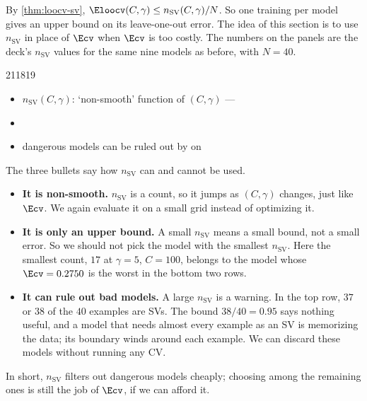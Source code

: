 By \autoref{thm:loocv-sv}, \(\Eloocv(C, \gamma) \le n_{\mathrm{SV}}(C,
\gamma) / N\). So one training per model gives an upper bound on its
leave-one-out error. The idea of this section is to use \(n_{\mathrm{SV}}\)
in place of \(\Ecv\) when \(\Ecv\) is too costly. The numbers on the panels
are the deck's \(n_{\mathrm{SV}}\) values for the same nine models as
before, with \(N = 40\).

\begin{center}
    \begin{minipage}[c]{0.56\textwidth}
        \centering
            {21}{18}{19}
    \end{minipage}%
    \hfill
    \begin{minipage}[c]{0.4\textwidth}
        \begin{itemize}
            \item \(n_{\mathrm{SV}}(C, \gamma)\): `non-smooth' function of
                \((C, \gamma)\) --- 
            \item {}
            \item dangerous models can be ruled out by
                 on 
        \end{itemize}
    \end{minipage}
\end{center}

The three bullets say how \(n_{\mathrm{SV}}\) can and cannot be used.
\begin{itemize}
    \item \textbf{It is non-smooth.} \(n_{\mathrm{SV}}\) is a count, so it
        jumps as \((C, \gamma)\) changes, just like \(\Ecv\). We again
        evaluate it on a small grid instead of optimizing it.
    \item \textbf{It is only an upper bound.} A small \(n_{\mathrm{SV}}\)
        means a small bound, not a small error. So we should not pick the
        model with the smallest \(n_{\mathrm{SV}}\). Here the smallest
        count, \(17\) at \(\gamma = 5\), \(C = 100\), belongs to the model
        whose \(\Ecv = 0.2750\) is the worst in the bottom two rows.
    \item \textbf{It can rule out bad models.} A large \(n_{\mathrm{SV}}\)
        is a warning. In the top row, \(37\) or \(38\) of the \(40\)
        examples are SVs. The bound \(38/40 = 0.95\) says nothing useful,
        and a model that needs almost every example as an SV is memorizing
        the data; its boundary winds around each example. We can discard
        these models without running any CV.
\end{itemize}
In short, \(n_{\mathrm{SV}}\) filters out dangerous models cheaply; choosing
among the remaining ones is still the job of \(\Ecv\), if we can afford it.


